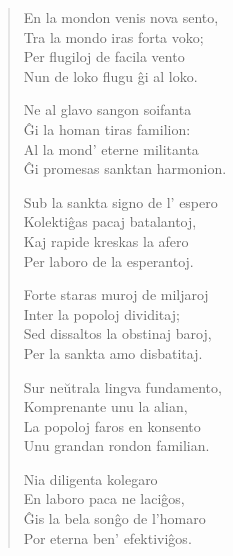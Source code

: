 \begin{verse}
                   En la mondon venis nova sento,\\
                   Tra la mondo iras forta voko;\\
                   Per flugiloj de facila vento\\
                   Nun de loko flugu \^gi al loko.

                      \vin  Ne al glavo sangon soifanta\\
                     \vin   \^Gi la homan tiras familion:\\
                     \vin   Al la mond' eterne militanta\\
                     \vin   \^Gi promesas sanktan harmonion.

                   Sub la sankta signo de l' espero\\
                   Kolekti\^gas pacaj batalantoj,\\
                   Kaj rapide kreskas la afero\\
                   Per laboro de la esperantoj.

                    \vin    Forte staras muroj de miljaroj\\
                    \vin    Inter la popoloj dividitaj;\\
                    \vin    Sed dissaltos la obstinaj baroj,\\
                    \vin    Per la sankta amo disbatitaj.

                   Sur ne\u utrala lingva fundamento,\\
                   Komprenante unu la alian,\\
                   La popoloj faros en konsento\\
                   Unu grandan rondon familian.

                    \vin    Nia diligenta kolegaro\\
                     \vin   En laboro paca ne laci\^gos,\\
                     \vin   \^Gis la bela son\^go de l'homaro\\
                     \vin   Por eterna ben' efektivi\^gos.



\end{verse}


\smallrule{}
